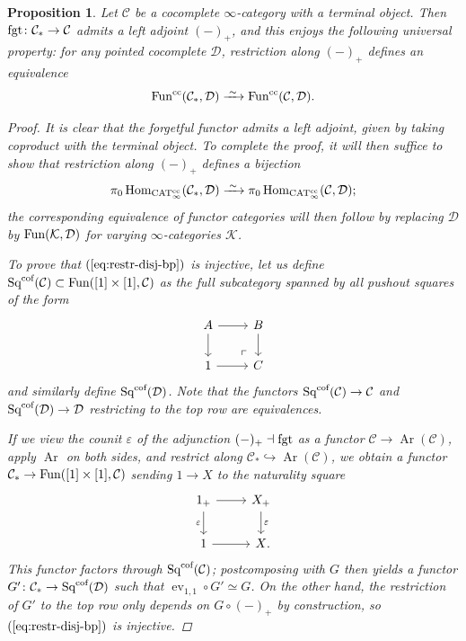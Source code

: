 \documentclass[reqno]{memo-l}
\theoremstyle{mythm}
\newtheorem{prop}[thm]{Proposition}
\theoremstyle{definition}
\numberwithin{equation}{section}
\newcommand{\Cc}{{\mathcal{C}}}
\newcommand{\Dd}{{\mathcal{D}}}
\newcommand{\Kk}{{\mathcal{K}}}
\DeclareMathOperator{\ev}{ev}
\newcommand{\Sqcof}{{\textup{Sq}^\textup{cof}}}
\renewcommand{\epsilon}{\varepsilon}
\DeclareMathOperator{\CAT}{CAT}
\renewcommand{\hom}{\textup{hom}}
\newcommand{\Fun}{{\textup{Fun}}}
\DeclareMathOperator{\Ar}{Ar}
\renewcommand{\hom}{{\textup{Hom}}}
\newcommand{\fgt}{\textup{fgt}}
\newcommand{\iso}{\xrightarrow{\;\smash{\raisebox{-0.25ex}{\ensuremath{\scriptstyle\sim}}}\;}}
\begin{document}
\begin{prop}\label{prop:univ-prop-*-cc}
    Let $\Cc$ be a cocomplete $\infty$-category with a terminal object. Then $\fgt\colon\Cc_*\to\Cc$ admits a left adjoint $(-)_+$, and this enjoys the following universal property: for any pointed cocomplete $\Dd$, restriction along $(-)_+$ defines an equivalence
    \[
        \Fun^\textup{cc}(\Cc_*,\Dd)\iso\Fun^\textup{cc}(\Cc,\Dd).
    \]
    \begin{proof}
        It is clear that the forgetful functor admits a left adjoint, given by taking coproduct with the terminal object. To complete the proof, it will then suffice to show that restriction along $(-)_+$ defines a bijection
        \begin{equation}\label{eq:restr-disj-bp}
            \mathop{\pi_0}\hom_{\CAT_\infty^\text{cc}}(\Cc_*,\Dd)\iso\mathop{\pi_0}\hom_{\CAT_\infty^\text{cc}}(\Cc,\Dd);
        \end{equation}
        the corresponding equivalence of functor categories will then follow by replacing $\Dd$ by $\Fun(\Kk,\Dd)$ for varying $\infty$-categories $\Kk$.

        To prove that $(\ref{eq:restr-disj-bp})$ is injective, let us define $\Sqcof(\Cc)\subset\Fun([1]\times[1],\Cc)$ as the full subcategory spanned by all pushout squares of the form
        \[
            \begin{tikzcd}
                A\arrow[r]\arrow[d]\arrow[dr,"\ulcorner"{very near end},phantom]& B\arrow[d]\\
                1 \arrow[r] & C
            \end{tikzcd}
        \]
        and similarly define $\Sqcof(\Dd)$. Note that the functors $\Sqcof(\Cc)\to\Cc$ and $\Sqcof(\Dd)\to\Dd$ restricting to the top row are equivalences. 

        If we view the counit $\epsilon$ of the adjunction $(-)_+\dashv\fgt$ as a functor $\Cc\to\Ar(\Cc)$, apply $\Ar$ on both sides, and restrict along $\Cc_*\hookrightarrow\Ar(\Cc)$, we obtain a functor $\Cc_*\to\Fun([1]\times[1],\Cc)$ sending $1\to X$ to the naturality square
        \begin{equation}\label{diag:nat-+-fgt}
            \begin{tikzcd}
                1_+\arrow[d,"\epsilon"']\arrow[r] & X_+\arrow[d,"\epsilon"]\\
                1\arrow[r] & X\rlap.
            \end{tikzcd}
        \end{equation}
        This functor factors through $\Sqcof(\Cc)$; postcomposing with $G$ then yields a functor $G'\colon\Cc_*\to\Sqcof(\Dd)$ such that ${\ev_{1,1}}\circ G'\simeq G$. On the other hand, the restriction of $G'$ to the top row only depends on $G\circ (-)_+$ by construction, so $(\ref{eq:restr-disj-bp})$ is injective.


\end{proof}
\end{prop}
\end{document}
